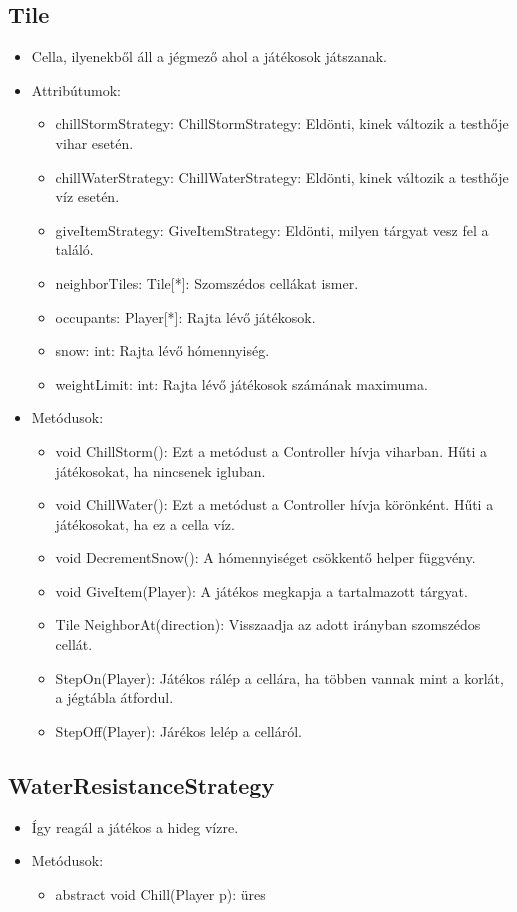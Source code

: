 \subsection{Tile}
\begin{itemize}
	\item Cella, ilyenekből áll a jégmező ahol a játékosok játszanak.
\item Attribútumok:
\begin{itemize}
	\item chillStormStrategy: ChillStormStrategy: Eldönti, kinek változik a testhője vihar esetén.
	\item chillWaterStrategy: ChillWaterStrategy: Eldönti, kinek változik a testhője víz esetén.
	\item giveItemStrategy: GiveItemStrategy: Eldönti, milyen tárgyat vesz fel a találó.
	\item neighborTiles: Tile[*]: Szomszédos cellákat ismer.
	\item occupants: Player[*]: Rajta lévő játékosok.
	\item snow: int: Rajta lévő hómennyiség.
	\item weightLimit: int: Rajta lévő játékosok számának maximuma.
	
\end{itemize}
\item Metódusok:
\begin{itemize}
	\item void ChillStorm(): Ezt a metódust a Controller hívja viharban. Hűti a játékosokat, ha nincsenek igluban.
	\item void ChillWater(): Ezt a metódust a Controller hívja körönként. Hűti a játékosokat, ha ez a cella víz.
	\item void DecrementSnow(): A hómennyiséget csökkentő helper függvény.
	\item void GiveItem(Player): A játékos megkapja a tartalmazott tárgyat.
	\item Tile NeighborAt(direction): Visszaadja az adott irányban szomszédos cellát.
	\item StepOn(Player): Játékos rálép a cellára, ha többen vannak mint a korlát, a jégtábla átfordul.
	\item StepOff(Player): Járékos lelép a celláról.
\end{itemize}
\end{itemize}

\subsection{WaterResistanceStrategy}
\begin{itemize}
	\item Így reagál a játékos a hideg vízre.
\item Metódusok:
\begin{itemize}
	\item abstract void Chill(Player p): üres
\end{itemize}
\end{itemize}



